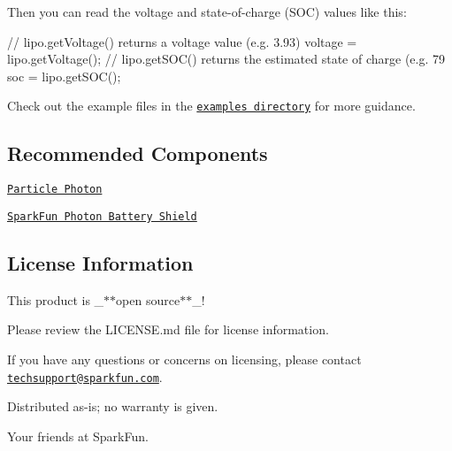 Then you can read the voltage and state-\/of-\/charge (S\+OC) values like this\+: \begin{DoxyVerb}// lipo.getVoltage() returns a voltage value (e.g. 3.93)
voltage = lipo.getVoltage();
// lipo.getSOC() returns the estimated state of charge (e.g. 79%
soc = lipo.getSOC();
\end{DoxyVerb}


Check out the example files in the \href{https://github.com/sparkfun/SparkFun_MAX17043_Particle_Library/tree/master/firmware/examples}{\tt examples directory} for more guidance.

\subsection*{Recommended Components }


\begin{DoxyItemize}
\item \href{https://www.sparkfun.com/products/13345}{\tt Particle Photon}
\item \href{https://www.sparkfun.com/products/13626}{\tt Spark\+Fun Photon Battery Shield}
\end{DoxyItemize}

\subsection*{License Information }

This product is \+\_\+$\ast$$\ast$open source$\ast$$\ast$\+\_\+!

Please review the L\+I\+C\+E\+N\+S\+E.\+md file for license information.

If you have any questions or concerns on licensing, please contact \href{mailto:techsupport@sparkfun.com}{\tt techsupport@sparkfun.\+com}.

Distributed as-\/is; no warranty is given.


\begin{DoxyItemize}
\item Your friends at Spark\+Fun. 
\end{DoxyItemize}
